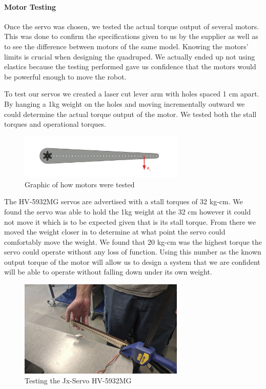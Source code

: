            \paragraph{Motor Testing} \label{par:MotorTesting}
                Once the servo was chosen, we tested the actual torque output of several motors. This was done to confirm the specifications given to us by the supplier as well as to see the difference between motors of the same model. Knowing the motors' limits is crucial when designing the quadruped. We actually ended up not using elastics because the testing performed gave us confidence that the motors would be powerful enough to move the robot.
                
                To test our servos we created a laser cut lever arm with holes spaced 1 cm apart. By hanging a 1kg weight on the holes and moving incrementally outward we could determine the actual torque output of the motor. We tested both the stall torques and operational torques.

                \begin{figure}[H]
                    \centering
                    \includegraphics[width=0.7\textwidth]{figures/MotorTestingDiagram.png}
                    \caption{Graphic of how motors were tested}
                    \label{fig:MotorTestingGraphic}
                \end{figure}

                The HV-5932MG servos are advertised with a stall torques of 32 kg-cm. We found the servo was able to hold the 1kg weight at the 32 cm however it could not move it which is to be expected given that is its stall torque. From there we moved the weight closer in to determine at what point the servo could comfortably move the weight. We found that 20 kg-cm was the highest torque the servo could operate without any loss of function. Using this number as the known output torque of the motor will allow us to design a system that we are confident will be able to operate without falling down under its own weight.


                \begin{figure}[H]
                    \centering
                    \includegraphics[width=0.7\textwidth]{figures/TestingMotors.png}
                    \caption{Testing the Jx-Servo HV-5932MG}
                    \label{fig:MotorTesting}
                \end{figure}

